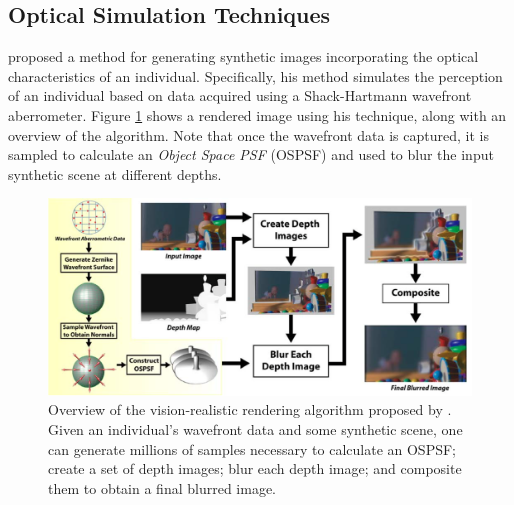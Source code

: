 
\subsection{Optical Simulation Techniques}
\label{subsec:OpticalSimulationTechniques}

\citet{Barsky2004} proposed a method for generating synthetic images incorporating the optical characteristics of an individual. Specifically, his method simulates the perception of an individual based on data acquired using a Shack-Hartmann wavefront aberrometer. Figure \ref{fig:barsky_algorithm} shows a rendered image using his technique, along with an overview of the algorithm. Note that once the wavefront data is captured, it is sampled to calculate an {\it Object Space PSF} (OSPSF) and used to blur the input synthetic scene at different depths.

\begin{figure}[h]

	\centering
	\includegraphics[width=0.99\linewidth]{__Images/03/barsky_pipeline.png}
	\caption[Overview of the vision-realistic rendering algorithm]{Overview of the vision-realistic rendering algorithm proposed by \citet{Barsky2004}. Given an individual's wavefront data and some synthetic scene, one can
	generate millions of samples necessary to calculate an OSPSF; create a set of depth images; blur each depth image; and composite them to obtain a final blurred image.}
	\label{fig:barsky_algorithm}
\end{figure}


